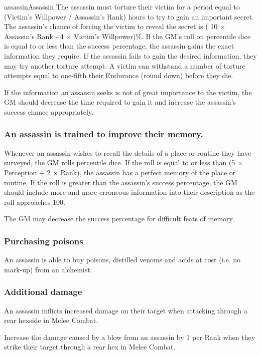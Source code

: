 \begin{Skill}{assassin}{Assassin}
The assassin must torture their victim for a period equal to (Victim’s
Willpower / Assassin’s Rank) hours to try to gain an important
secret. The assassin’s chance of forcing the victim to reveal the
secret is ( 10 × Assassin’s Rank - 4 × Victim’s Willpower)\%.  If the
GM’s roll on percentile dice is equal to or less than the success
percentage, the assassin gains the exact information they require. If
the assassin fails to gain the desired information, they may try
another torture attempt. A victim can withstand a number of torture
attempts equal to one-fifth their Endurance (round down) before they
die.

If the information an assassin seeks is not of great importance to the
victim, the GM should decrease the time required to gain it and
increase the assassin’s success chance appropriately.

\subsubsection{An assassin is trained to improve their memory.}

Whenever an assassin wishes to recall the details of a place or
routine they have surveyed, the GM rolls percentile dice.  If the roll
is equal to or less than (5 × Perception + 2 × Rank), the assassin has
a perfect memory of the place or routine. If the roll is greater than
the assassin’s success percentage, the GM should include more and more
erroneous information into their description as the roll approaches
100.

The GM may decrease the success percentage for difficult feats of
memory.

\subsubsection{Purchasing poisons}

An assassin is able to buy poisons, distilled venoms and acids at cost
(i.e. no mark-up) from an alchemist.

\subsubsection{Additional damage}

An assassin inflicts increased damage on their target when attacking
through a rear hexside in Melee Combat.

Increase the damage caused by a blow from an assassin by 1 per Rank
when they strike their target through a rear hex in Melee Combat.


\end{Skill}
